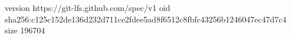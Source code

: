 version https://git-lfs.github.com/spec/v1
oid sha256:c125c152de136d232d711ce2fdee5ad8f6512c8fbfc43256b1246047ec47d7c4
size 196704
